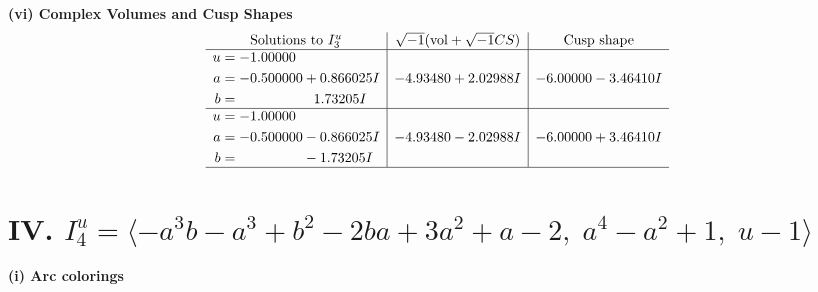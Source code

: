 \documentclass[1p]{elsarticle_modified}
\theoremstyle{definition}
\newcommand{\I}{\sqrt{-1}}
\begin{document}
\newpage\flushleft \textbf{(vi) Complex Volumes and Cusp Shapes}
$$\begin{array}{c|c|c}  
\text{Solutions to }I^u_{3}& \I (\text{vol} + \sqrt{-1}CS) & \text{Cusp shape}\\
 \hline 
\begin{aligned}
u &= -1.00000\phantom{ +0.000000I} \\
a &= -0.500000 + 0.866025 I \\
b &= \phantom{-0.000000 -}1.73205 I\end{aligned}
 & -4.93480 + 2.02988 I & -6.00000 - 3.46410 I \\ \hline\begin{aligned}
u &= -1.00000\phantom{ +0.000000I} \\
a &= -0.500000 - 0.866025 I \\
b &= \phantom{-0.000000 } -1.73205 I\end{aligned}
 & -4.93480 - 2.02988 I & -6.00000 + 3.46410 I\\
 \hline 
 \end{array}$$\newpage\newpage\renewcommand{\arraystretch}{1}
\centering \section*{IV. $I^u_{4}= \langle - a^3 b- a^3+b^2-2 b a+3 a^2+a-2,\;a^4- a^2+1,\;u-1 \rangle$}
\flushleft \textbf{(i) Arc colorings}\\
\end{document}
